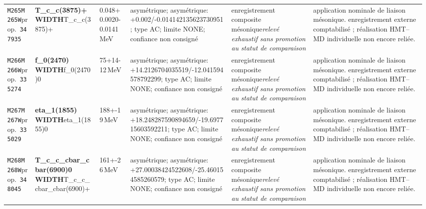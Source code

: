 \begin{landscape}
\begin{longtable}{L{1.85cm}L{4.45cm}L{2.35cm}L{4.05cm}L{3.35cm}L{7.15cm}}
\texttt{M265}\newline \texttt{M265W}\newline prop.\ \texttt{347935} & \textbf{T\_\allowbreak{}c\_\allowbreak{}c(3875)+ WIDTH}\newline T\_\allowbreak{}c\_\allowbreak{}c(3875)+ & 0.048+0.0020-0.0141\,MeV & asymétrique; asymétrique: +0.002/-0.014142135623730951; type AC; limite NONE; confiance non consigné & enregistrement composite mésonique\newline \emph{relevé exhaustif sans promotion au statut de comparaison} & application nominale de liaison mésonique. enregistrement externe comptabilisé ; réalisation HMT--MD individuelle non encore reliée. \\
\texttt{M266}\newline \texttt{M266W}\newline prop.\ \texttt{335274} & \textbf{f\_\allowbreak{}0(2470) WIDTH}\newline f\_\allowbreak{}0(2470)0 & 75+14-12\,MeV & asymétrique; asymétrique: +14.2126704035519/-12.041594578792299; type AC; limite NONE; confiance non consigné & enregistrement composite mésonique\newline \emph{relevé exhaustif sans promotion au statut de comparaison} & application nominale de liaison mésonique. enregistrement externe comptabilisé ; réalisation HMT--MD individuelle non encore reliée. \\
\texttt{M267}\newline \texttt{M267W}\newline prop.\ \texttt{335029} & \textbf{eta\_\allowbreak{}1(1855) WIDTH}\newline eta\_\allowbreak{}1(1855)0 & 188+-19\,MeV & asymétrique; asymétrique: +18.248287590894659/-19.697715603592211; type AC; limite NONE; confiance non consigné & enregistrement composite mésonique\newline \emph{relevé exhaustif sans promotion au statut de comparaison} & application nominale de liaison mésonique. enregistrement externe comptabilisé ; réalisation HMT--MD individuelle non encore reliée. \\
\texttt{M268}\newline \texttt{M268W}\newline prop.\ \texttt{348045} & \textbf{T\_\allowbreak{}c\_\allowbreak{}c\_\allowbreak{}cbar\_\allowbreak{}cbar(6900)0 WIDTH}\newline T\_\allowbreak{}c\_\allowbreak{}c\_\allowbreak{}cbar\_\allowbreak{}cbar(6900)+ & 161+-26\,MeV & asymétrique; asymétrique: +27.00038424522608/-25.460154585260579; type AC; limite NONE; confiance non consigné & enregistrement composite mésonique\newline \emph{relevé exhaustif sans promotion au statut de comparaison} & application nominale de liaison mésonique. enregistrement externe comptabilisé ; réalisation HMT--MD individuelle non encore reliée. \\

\end{longtable}
\end{landscape}
